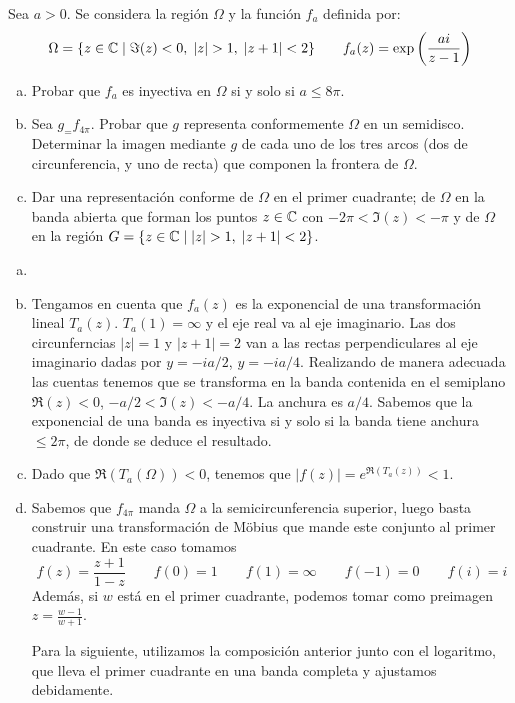 \documentclass[twoside]{article}
\begin{document}
\begin{ejercicio}{12}
Sea $a>0$. Se considera la región $\Omega$ y la función $f_a$ definida por:
$$
\Omega=\{z\in \C \mid \Im(z)<0,\;|z|>1,\;|z+1|<2\} \qquad f_a(z)=\exp\left(\frac{ai}{z-1}\right)
$$
\begin{enumerate}[(a)]
\item Probar que $f_a$ es inyectiva en $\Omega$ si y solo si $a\leq 8\pi$.
\item Sea $g_=f_{4\pi}$. Probar que $g$ representa conformemente $\Omega$ en un semidisco. Determinar la imagen mediante $g$ de cada uno de los tres arcos (dos de circunferencia, y uno de recta) que componen la frontera de $\Omega$.
\item Dar una representación conforme de $\Omega$ en el primer cuadrante; de $\Omega$ en la banda abierta que forman los puntos  $z\in \mathbb{C}$ con $-2\pi<\Im(z) <-\pi$ y de $\Omega$ en la región $G=\{z\in\C\mid |z|>1,\;|z+1|<2\}$.
\end{enumerate}
\end{ejercicio}
\begin{solucion}
\begin{enumerate}[(a)]
\item []
\item
Tengamos en cuenta que $f_a(z)$ es la exponencial de una transformación lineal $T_a(z)$. $T_a(1)=\infty$ y el eje real va al eje imaginario. Las dos circunferncias $|z|=1$ y $|z+1|=2$ van a las rectas perpendiculares al eje imaginario dadas por $y=-ia/2$, $y=-ia/4$. Realizando de manera adecuada las cuentas tenemos que se transforma en la banda contenida en el semiplano $\Re(z)<0$, $-a/2<\Im(z)<-a/4$. La anchura es $a/4$. Sabemos que la exponencial de una banda es inyectiva si y solo si la banda tiene anchura $\leq 2\pi$, de donde se deduce el resultado.

\item Dado que $\Re(T_a(\Omega))<0$, tenemos que $|f(z)|=e^{\Re(T_a(z))}<1$.
\item Sabemos que $f_{4\pi}$ manda $\Omega$ a la semicircunferencia superior, luego basta construir una transformación de Möbius que mande este conjunto al primer cuadrante. En este caso tomamos
$$
f(z)=\frac{z+1}{1-z} \qquad f(0)=1 \qquad f(1)=\infty \qquad f(-1) = 0 \qquad f(i) = i
$$
Además, si $w$ está  en el primer cuadrante, podemos tomar como preimagen $z = \frac{w -1}{w +1}$.  

Para la siguiente, utilizamos la composición anterior junto con el logaritmo, que lleva el primer cuadrante en una banda completa y ajustamos debidamente.


\end{enumerate}
\end{solucion}
\newpage
\end{document}
